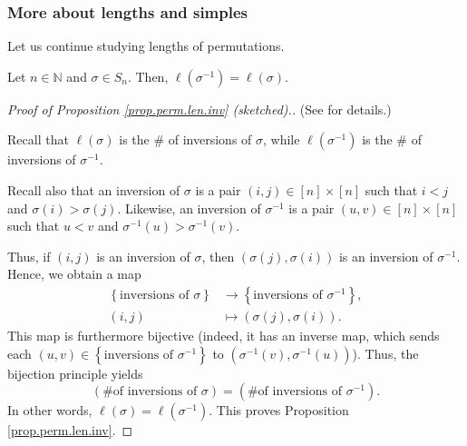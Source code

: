 \subsubsection{More about lengths and simples}

Let us continue studying lengths of permutations.

\begin{proposition}
\label{prop.perm.len.inv}Let $n\in\mathbb{N}$ and $\sigma\in S_{n}$. Then,
$\ell\left(  \sigma^{-1}\right)  =\ell\left(  \sigma\right)  $.
\end{proposition}

\begin{proof}
[Proof of Proposition \ref{prop.perm.len.inv} (sketched).](See \cite[Exercise
5.2 \textbf{(f)}]{detnotes} for details.)

Recall that $\ell\left(  \sigma\right)  $ is the \# of inversions of $\sigma$,
while $\ell\left(  \sigma^{-1}\right)  $ is the \# of inversions of
$\sigma^{-1}$.

Recall also that an inversion of $\sigma$ is a pair $\left(  i,j\right)
\in\left[  n\right]  \times\left[  n\right]  $ such that $i<j$ and
$\sigma\left(  i\right)  >\sigma\left(  j\right)  $. Likewise, an inversion of
$\sigma^{-1}$ is a pair $\left(  u,v\right)  \in\left[  n\right]
\times\left[  n\right]  $ such that $u<v$ and $\sigma^{-1}\left(  u\right)
>\sigma^{-1}\left(  v\right)  $.

Thus, if $\left(  i,j\right)  $ is an inversion of $\sigma$, then $\left(
\sigma\left(  j\right)  ,\sigma\left(  i\right)  \right)  $ is an inversion of
$\sigma^{-1}$. Hence, we obtain a map%
\begin{align*}
\left\{  \text{inversions of }\sigma\right\}   &  \rightarrow\left\{
\text{inversions of }\sigma^{-1}\right\}  ,\\
\left(  i,j\right)   &  \mapsto\left(  \sigma\left(  j\right)  ,\sigma\left(
i\right)  \right)  .
\end{align*}
This map is furthermore bijective (indeed, it has an inverse map, which sends
each $\left(  u,v\right)  \in\left\{  \text{inversions of }\sigma
^{-1}\right\}  $ to $\left(  \sigma^{-1}\left(  v\right)  ,\sigma^{-1}\left(
u\right)  \right)  $). Thus, the bijection principle yields%
\[
\left(  \text{\# of inversions of }\sigma\right)  =\left(  \text{\# of
inversions of }\sigma^{-1}\right)  .
\]
In other words, $\ell\left(  \sigma\right)  =\ell\left(  \sigma^{-1}\right)
$. This proves Proposition \ref{prop.perm.len.inv}.
\end{proof}

